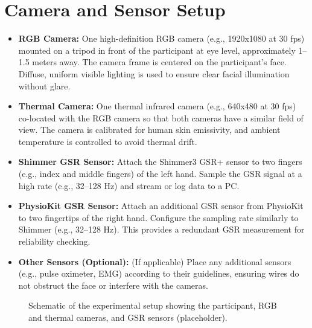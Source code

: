 \documentclass{article}
\begin{document}
\section{Camera and Sensor Setup}
\begin{itemize}
    \item \textbf{RGB Camera:} One high-definition RGB camera (e.g., 1920x1080 at 30 fps) mounted on a tripod in front of the participant at eye level, approximately 1–1.5 meters away. The camera frame is centered on the participant’s face. Diffuse, uniform visible lighting is used to ensure clear facial illumination without glare.
    \item \textbf{Thermal Camera:} One thermal infrared camera (e.g., 640x480 at 30 fps) co-located with the RGB camera so that both cameras have a similar field of view. The camera is calibrated for human skin emissivity, and ambient temperature is controlled to avoid thermal drift.
    \item \textbf{Shimmer GSR Sensor:} Attach the Shimmer3 GSR+ sensor to two fingers (e.g., index and middle fingers) of the left hand. Sample the GSR signal at a high rate (e.g., 32–128 Hz) and stream or log data to a PC.
    \item \textbf{PhysioKit GSR Sensor:} Attach an additional GSR sensor from PhysioKit to two fingertips of the right hand. Configure the sampling rate similarly to Shimmer (e.g., 32–128 Hz). This provides a redundant GSR measurement for reliability checking.
    \item \textbf{Other Sensors (Optional):} (If applicable) Place any additional sensors (e.g., pulse oximeter, EMG) according to their guidelines, ensuring wires do not obstruct the face or interfere with the cameras.
\end{itemize}

\begin{figure}[h]
    \centering
    \caption{Schematic of the experimental setup showing the participant, RGB and thermal cameras, and GSR sensors (placeholder).}
\end{figure}
\end{document}
